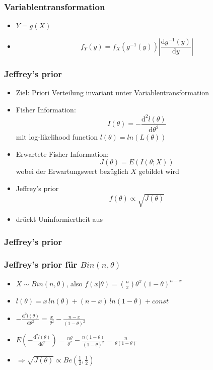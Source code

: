 \documentclass[aspectratio=169,xcolor=dvipsnames]{beamer}
\newtheorem{satz}{Satz}
\begin{document}
\begin{frame}
\frametitle{Variablentransformation}
\begin{itemize}
	\item $Y=g(X)$
	\item $$f_Y(y)=f_X(g^{-1}(y))\left|\frac{\text{d}g^{-1}(y)}{\text{d}y}\right|$$
\end{itemize}
\end{frame}

\begin{frame}
\frametitle{Jeffrey's prior}
\begin{itemize}
	\item<1-> Ziel: Priori Verteilung invariant unter Variablentransformation
	\item<2-> Fisher Information: $$I(\theta)=-\frac{\text{d}^2l(\theta)}{\text{d}\theta^2}$$
	mit log-likelihood function $l(\theta)=ln(L(\theta))$
	\item<3-> Erwartete Fisher Information: $$J(\theta)=E(I(\theta;X))$$
	wobei der Erwartungswert bezüglich $X$ gebildet wird
	\item<4-> Jeffrey's prior $$f(\theta)\propto\sqrt{J(\theta)}$$
	\item<5-> drückt Uninformiertheit aus
\end{itemize}
\end{frame}

\begin{frame}
\frametitle{Jeffrey's prior}
\end{frame}

\begin{frame}
\frametitle{Jeffrey's prior für $Bin(n,\theta)$}
\begin{itemize}
	\item<1-> $X\sim Bin(n,\theta)$, also $f(x|\theta)= \binom{n}{x}\theta^x(1-\theta)^{n-x}$
	\item<2-> $l(\theta)=x\,ln(\theta)+(n-x)\,ln(1-\theta)+const$
	\item<3-> $-\frac{\text{d}^2l(\theta)}{\text{d}\theta^2}=\frac{x}{\theta^2}-\frac{n-x}{(1-\theta)^2}$ 
	\item<4-> $E(-\frac{\text{d}^2l(\theta)}{\text{d}\theta^2}) = \frac{n\theta}{\theta^2}-\frac{n(1-\theta)}{(1-\theta)^2}=\frac{n}{\theta(1-\theta)}$
	\item<5-> $\Rightarrow \sqrt{J(\theta)}\propto Be(\frac{1}{2},\frac{1}{2})$
\end{itemize}
\end{frame}
\end{document}
